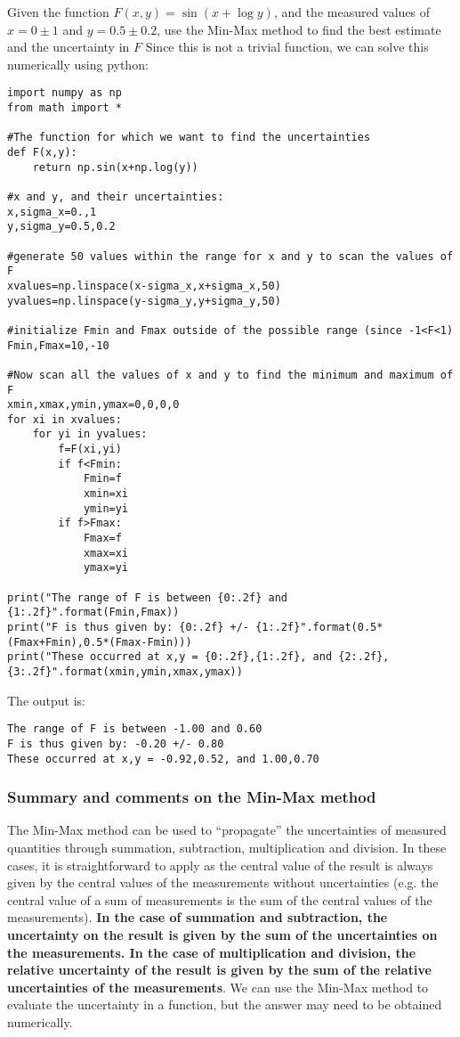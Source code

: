 \begin{example}{}{Given the function $F(x,y)=\sin(x+\log y)$, and the measured values of $x=0\pm1$ and $y=0.5\pm0.2$, use the Min-Max method to find the best estimate and the uncertainty in $F$}{}
Since this is not a trivial function, we can solve this numerically using python:

\begin{lstlisting}[frame=single] 
import numpy as np
from math import *

#The function for which we want to find the uncertainties
def F(x,y):
    return np.sin(x+np.log(y))

#x and y, and their uncertainties:
x,sigma_x=0.,1
y,sigma_y=0.5,0.2

#generate 50 values within the range for x and y to scan the values of F
xvalues=np.linspace(x-sigma_x,x+sigma_x,50)
yvalues=np.linspace(y-sigma_y,y+sigma_y,50)

#initialize Fmin and Fmax outside of the possible range (since -1<F<1)
Fmin,Fmax=10,-10

#Now scan all the values of x and y to find the minimum and maximum of F
xmin,xmax,ymin,ymax=0,0,0,0
for xi in xvalues:
    for yi in yvalues:
        f=F(xi,yi)
        if f<Fmin:
            Fmin=f
            xmin=xi
            ymin=yi
        if f>Fmax:
            Fmax=f
            xmax=xi
            ymax=yi
            
print("The range of F is between {0:.2f} and {1:.2f}".format(Fmin,Fmax))
print("F is thus given by: {0:.2f} +/- {1:.2f}".format(0.5*(Fmax+Fmin),0.5*(Fmax-Fmin)))
print("These occurred at x,y = {0:.2f},{1:.2f}, and {2:.2f},{3:.2f}".format(xmin,ymin,xmax,ymax))
\end{lstlisting}
The output is:
\begin{verbatim}
The range of F is between -1.00 and 0.60
F is thus given by: -0.20 +/- 0.80
These occurred at x,y = -0.92,0.52, and 1.00,0.70
\end{verbatim}
\end{example}

\subsubsection{Summary and comments on the Min-Max method}
The Min-Max method can be used to ``propagate'' the uncertainties of measured quantities through summation, subtraction, multiplication and division. In these cases, it is straightforward to apply as the central value of the result is always given by the central values of the measurements without uncertainties (e.g. the central value of a sum of measurements is the sum of the central values of the measurements). \textbf{In the case of summation and subtraction, the uncertainty on the result is given by the sum of the uncertainties on the measurements. In the case of multiplication and division, the relative uncertainty of the result is given by the sum of the relative uncertainties of the measurements}. We can use the Min-Max method to evaluate the uncertainty in a function, but the answer may need to be obtained numerically.

